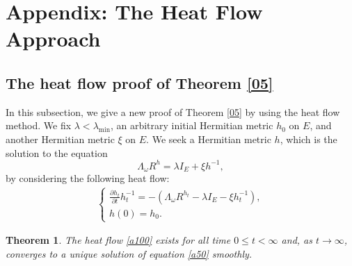 \documentclass[11pt]{amsart}
\newtheorem{theorem}{Theorem}[section]
\numberwithin{equation}{section}
\theoremstyle{remark}
\newcommand{\pa}{\partial}
\newcommand{\lb}{\left (}
\newcommand{\rb}{\right )}
\begin{document}




\section{Appendix: The Heat Flow Approach} \label{s40}

\subsection{The heat flow proof of Theorem \ref{05}}
In this subsection, we give a new proof of Theorem \ref{05} by using the heat flow method. We fix $\lambda<\lambda_{\min}$, an arbitrary initial Hermitian metric $h_0$ on $E$, and another Hermitian metric $\xi$ on $E$. We seek a Hermitian metric $h$, which is the solution to the equation
\begin{equation}\label{a50}
\Lambda_\omega R^h=\lambda I_E+\xi h^{-1},
\end{equation}
by considering the following heat flow: 
\begin{eqnarray}\label{a100}
\begin{cases}
\frac{\pa h_t}{\pa t}h_t^{-1}=-\lb \Lambda_\omega R^{h_t}-\lambda I_E-\xi h_t^{-1}\rb,\\
h(0)=h_0.
\end{cases}
\end{eqnarray}

\begin{theorem}\label{a105}
The heat flow \eqref{a100} exists for all time $0\leq t <\infty$ and, as $t\to\infty$, converges to a unique solution of equation \eqref{a50} smoothly.
\end{theorem}
\end{document}

